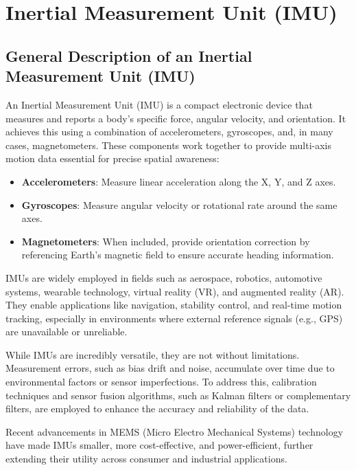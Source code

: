 %
%
%
%

	\chapter{Inertial Measurement Unit (IMU)}
	
	\section{General Description of an Inertial Measurement Unit (IMU)}
	
	An Inertial Measurement Unit (IMU) is a compact electronic device that measures and reports a body's specific force, angular velocity, and orientation. It achieves this using a combination of accelerometers, gyroscopes, and, in many cases, magnetometers. These components work together to provide multi-axis motion data essential for precise spatial awareness:
	
	\begin{itemize}
		\item \textbf{Accelerometers}: Measure linear acceleration along the X, Y, and Z axes.
		\item \textbf{Gyroscopes}: Measure angular velocity or rotational rate around the same axes.
		\item \textbf{Magnetometers}: When included, provide orientation correction by referencing Earth's magnetic field to ensure accurate heading information\cite{Arduino:2024h}.
	\end{itemize}
	
IMUs are widely employed in fields such as aerospace, robotics, automotive systems, wearable technology, virtual reality (VR), and augmented reality (AR). They enable applications like navigation, stability control, and real-time motion tracking, especially in environments where external reference signals (e.g., GPS) are unavailable or unreliable.\cite{Bosch:2024}
	
While IMUs are incredibly versatile, they are not without limitations. Measurement errors, such as bias drift and noise, accumulate over time due to environmental factors or sensor imperfections. To address this, calibration techniques and sensor fusion algorithms, such as Kalman filters or complementary filters, are employed to enhance the accuracy and reliability of the data.\cite{Kalman:2012}
	
Recent advancements in MEMS (Micro Electro Mechanical Systems) technology have made IMUs smaller, more cost-effective, and power-efficient, further extending their utility across consumer and industrial applications.\cite{Khoshnoud:2012}
	



